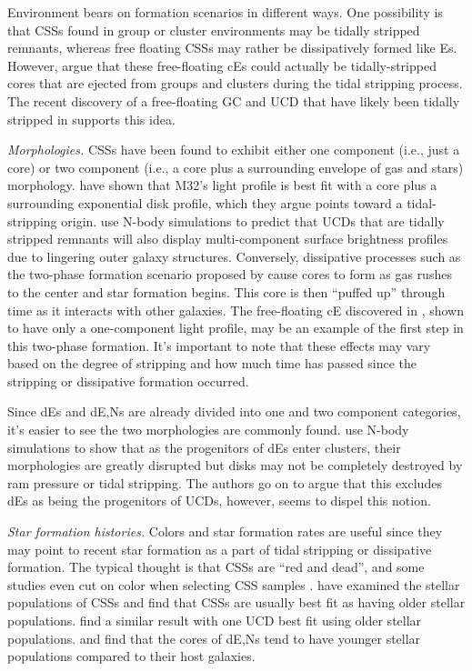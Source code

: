 \documentclass[iop,apj]{emulateapj}
\begin{document}
Environment bears on formation scenarios in different ways. One possibility is that CSSs found in group or cluster environments may be tidally stripped remnants, whereas free floating CSSs may rather be dissipatively formed like Es. However, \citet{Chilingarian2015} argue that these free-floating cEs could actually be tidally-stripped cores that are ejected from groups and clusters during the tidal stripping process. The recent discovery of a free-floating GC and UCD that have likely been tidally stripped in \citet{Sandoval2015} supports this idea.

\textit{Morphologies.} CSSs have been found to exhibit either one component (i.e., just a core) or two component (i.e., a core plus a surrounding envelope of gas and stars) morphology. \citet{Graham2002} have shown that M32's light profile is best fit with a core plus a surrounding exponential disk profile, which they argue points toward a tidal-stripping origin. \citet{Pfeffer2013} use N-body simulations to predict that UCDs that are tidally stripped remnants will also display multi-component surface brightness profiles due to lingering outer galaxy structures. Conversely, dissipative processes such as the two-phase formation scenario proposed by \citet{Oser2010} cause cores to form as gas rushes to the center and star formation begins. This core is then ``puffed up'' through time as it interacts with other galaxies. The free-floating cE discovered in \citet{Huxor2013}, shown to have only a one-component light profile, may be an example of the first step in this two-phase formation. It's important to note that these effects may vary based on the degree of stripping and how much time has passed since the stripping or dissipative formation occurred.

Since dEs and dE,Ns are already divided into one and two component categories, it's easier to see the two morphologies are commonly found. \citet{Mastropietro2005a} use N-body simulations to show that as the progenitors of dEs enter clusters, their morphologies are greatly disrupted but disks may not be completely destroyed by ram pressure or tidal stripping. The authors go on to  argue that this excludes dEs as being the progenitors of UCDs, however, \citet{Pfeffer2013} seems to dispel this notion. 

\textit{Star formation histories.} 
Colors and star formation rates are useful since they may point to recent star formation as a part of tidal stripping or dissipative formation. The typical thought is that CSSs are ``red and dead'', and some studies even cut on color when selecting CSS samples \citep{Chilingarian2015}. \citet{Drinkwater2000} have examined the stellar populations of CSSs and find that CSSs are usually best fit as having older stellar populations. \citet{Norris2011} find a similar result with one UCD best fit using older stellar populations. \citet{Drinkwater2000} and \citet{Ferrarese2006} find that the cores of dE,Ns tend to have younger stellar populations compared to their host galaxies. 
\end{document}
